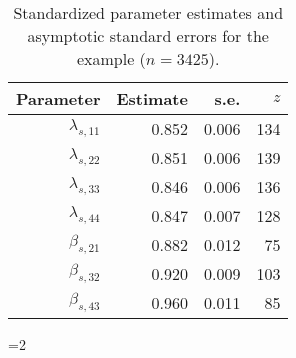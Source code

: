 \documentclass[a4paper, 11pt]{article}
\newcommand{\0}{\boldsymbol{0}}
\begin{document}
\begin{table}\begin{center}
\begin{tabular}{rrrr}\hline\hline
 Parameter & 	Estimate &	s.e. &	$z$\\
 \hline
$\lambda_{s,11}$ & 0.852& 0.006 &  134\\
$\lambda_{s,22}$ &0.851 &0.006  & 139\\
$\lambda_{s,33}$ &0.846 &0.006  & 136\\
$\lambda_{s,44}$ &0.847& 0.007  & 128\\
$\beta_{s,21}$& 0.882           &0.012 & 75\\
$\beta_{s,32}$& 0.920            &0.009 &103\\
$\beta_{s,43}$& 0.960            &0.011  &85\\
\hline\hline
\end{tabular}
\caption{Standardized parameter estimates and asymptotic standard errors for the example ($n = 3425$).}
\label{tab:vcov}\end{center}
\end{table}
=2
\end{document}
